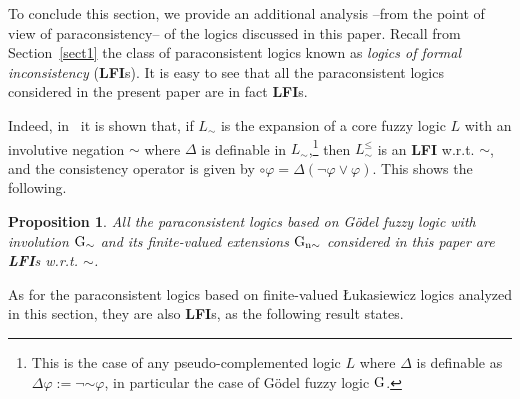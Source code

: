 \documentclass{article}
\newtheorem{proposition}{Proposition}
\theoremstyle{definition}
\newcommand{\ninv}{\mathord{\sim}}
\begin{document}
{To conclude this section, we provide an additional analysis --from the point of view of paraconsistency-- of the logics discussed in this paper.
Recall from  Section~\ref{sect1} the class of paraconsistent logics known as {\em logics of formal inconsistency} ({\bf LFI}s). It is easy to see that all the paraconsistent logics considered in the present paper are in fact {\bf LFI}s.

Indeed, in~\cite{EEFGN} it is shown that, if $L_{\ninv}$ is the expansion of a core fuzzy logic $L$ with an involutive negation $\ninv$ where  $\Delta$ is definable in $L_{\ninv}$,\footnote{This is the case of any pseudo-complemented logic $L$ where $\Delta$ is definable as $\Delta \varphi := \neg \ninv \varphi$, in particular the case of G\"odel fuzzy logic $\rm{G}$.}
then $L^{\leq}_{\ninv}$ is an {\bf LFI} w.r.t. $\ninv$, and the consistency operator is given by ${\circ}\varphi = \Delta(\neg \varphi \vee \varphi)$. This shows the following.

\begin{proposition}
All the paraconsistent logics based on G\"odel fuzzy logic with involution $\rm{G}_{\ninv}$ and its finite-valued extensions $\rm{G}_{n\ninv}$ considered in this paper are {\bf LFI}s w.r.t. $\ninv$.
\end{proposition}

As for the paraconsistent logics based on finite-valued {\L}ukasiewicz logics analyzed in this section, they are also {\bf LFI}s, as the following result states. }
\end{document}

